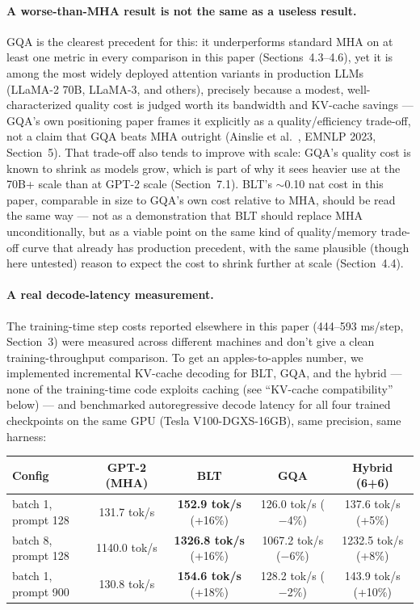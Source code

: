 \documentclass[11pt]{article}
\begin{document}
\paragraph{A worse-than-MHA result is not the same as a useless result.} GQA is the clearest precedent for this: it underperforms standard MHA on at least one metric in every comparison in this paper (Sections~4.3--4.6), yet it is among the most widely deployed attention variants in production LLMs (LLaMA-2 70B, LLaMA-3, and others), precisely because a modest, well-characterized quality cost is judged worth its bandwidth and KV-cache savings --- GQA's own positioning paper frames it explicitly as a quality/efficiency trade-off, not a claim that GQA beats MHA outright (Ainslie et al.~\cite{ainslie2023gqa}, EMNLP 2023, Section~5). That trade-off also tends to improve with scale: GQA's quality cost is known to shrink as models grow, which is part of why it sees heavier use at the 70B+ scale than at GPT-2 scale (Section~7.1). BLT's $\sim$0.10 nat cost in this paper, comparable in size to GQA's own cost relative to MHA, should be read the same way --- not as a demonstration that BLT should replace MHA unconditionally, but as a viable point on the same kind of quality/memory trade-off curve that already has production precedent, with the same plausible (though here untested) reason to expect the cost to shrink further at scale (Section~4.4).

\paragraph{A real decode-latency measurement.} The training-time step costs reported elsewhere in this paper (444--593 ms/step, Section~3) were measured across different machines and don't give a clean training-throughput comparison. To get an apples-to-apples number, we implemented incremental KV-cache decoding for BLT, GQA, and the hybrid --- none of the training-time code exploits caching (see ``KV-cache compatibility'' below) --- and benchmarked autoregressive decode latency for all four trained checkpoints on the same GPU (Tesla V100-DGXS-16GB), same precision, same harness:

\begin{center}
\begin{tabular}{lcccc}
\toprule
Config & GPT-2 (MHA) & BLT & GQA & Hybrid (6+6) \\
\midrule
batch 1, prompt 128 & 131.7 tok/s & \textbf{152.9 tok/s} (+16\%) & 126.0 tok/s ($-$4\%) & 137.6 tok/s (+5\%) \\
batch 8, prompt 128 & 1140.0 tok/s & \textbf{1326.8 tok/s} (+16\%) & 1067.2 tok/s ($-$6\%) & 1232.5 tok/s (+8\%) \\
batch 1, prompt 900 & 130.8 tok/s & \textbf{154.6 tok/s} (+18\%) & 128.2 tok/s ($-$2\%) & 143.9 tok/s (+10\%) \\
\bottomrule
\end{tabular}
\end{center}
\end{document}

